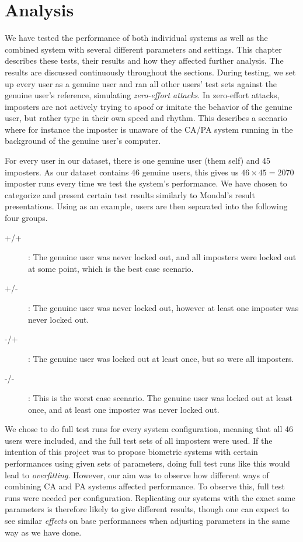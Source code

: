 \chapter{Analysis}
\label{chap:analysis}
We have tested the performance of both individual systems as well as the combined system with several different parameters and settings.
This chapter describes these tests, their results and how they affected further analysis.
The results are discussed continuously throughout the sections.
During testing, we set up every user as a genuine user and ran all other users' test sets against the genuine user's reference, simulating \textit{zero-effort attacks}.
In zero-effort attacks, imposters are not actively trying to spoof or imitate the behavior of the genuine user, but rather type in their own speed and rhythm.
This describes a scenario where for instance the imposter is unaware of the CA/PA system running in the background of the genuine user's computer.

For every user in our dataset, there is one genuine user (them self) and 45 imposters.
As our dataset contains 46 genuine users, this gives us $46 \times 45 = 2070$ imposter runs every time we test the system's performance.
We have chosen to categorize and present certain test results similarly to Mondal's \cite{mondal} result presentations.
Using  as an example, users are then separated into the following four groups.
\begin{description}
    \item [+/+]: The genuine user was never locked out, and all imposters were locked out at some point, which is the best case scenario.
    \item [+/-]: The genuine user was never locked out, however at least one imposter was never locked out.
    \item [-/+]: The genuine user was locked out at least once, but so were all imposters.
    \item [-/-]: This is the worst case scenario. The genuine user was locked out at least once, and at least one imposter was never locked out.
\end{description}

We chose to do full test runs for every system configuration, meaning that all 46 users were included, and the full test sets of all imposters were used.
If the intention of this project was to propose biometric systems with certain performances using given sets of parameters, doing full test runs like this would lead to \textit{overfitting}.
However, our aim was to observe how different ways of combining CA and PA systems affected performance.
To observe this, full test runs were needed per configuration.
Replicating our systems with the exact same parameters is therefore likely to give different results, though one can expect to see similar \textit{effects} on base performances when adjusting parameters in the same way as we have done.

